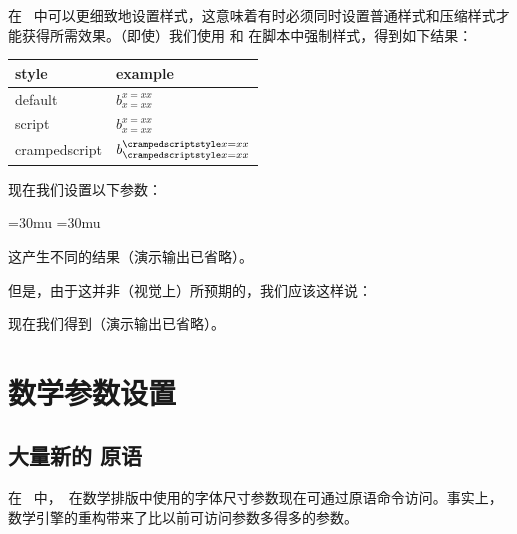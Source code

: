 在 \LUATEX\ 中可以更细致地设置样式，这意味着有时必须同时设置普通样式和压缩样式才能获得所需效果。（即使）我们使用  和  在脚本中强制样式，得到如下结果：

\begin{typing}
\begin{longtable}{l l}
\toprule style         & example \\
\midrule
default       & $b_{x=xx}^{x=xx}$ \\
script        & $b_{\scriptstyle x=xx}^{\scriptstyle x=xx}$ \\
crampedscript & $b_{\crampedscriptstyle x=xx}^{\crampedscriptstyle x=xx}$ \\
\bottomrule
\end{longtable}
\end{typing}



现在我们设置以下参数：

\begin{typing}
\Umathordrelspacing\scriptstyle=30mu
\Umathordordspacing\scriptstyle=30mu
\end{typing}



这产生不同的结果（演示输出已省略）。

但是，由于这并非（视觉上）所预期的，我们应该这样说：

\begin{typing}
\end{typing}

现在我们得到（演示输出已省略）。

\section{数学参数设置}

\subsection {大量新的  原语}


在 \LUATEX\ 中，\TEX\ 在数学排版中使用的字体尺寸参数现在可通过原语命令访问。事实上，数学引擎的重构带来了比以前可访问参数多得多的参数。

